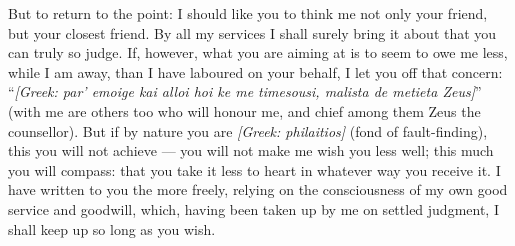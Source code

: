  But to return to the point: I should like you to think me not only your friend, but your closest friend. By all my services I shall surely bring it about that you can truly so judge. If, however, what you are aiming at is to seem to owe me less, while I am away, than I have laboured on your behalf, I let you off that concern: ``\textit{[Greek: par' emoige kai alloi hoi ke me timesousi, malista de metieta Zeus]}'' (with me are others too who will honour me, and chief among them Zeus the counsellor). But if by nature you are \textit{[Greek: philaitios]} (fond of fault-finding), this you will not achieve --- you will not make me wish you less well; this much you will compass: that you take it less to heart in whatever way you receive it. I have written to you the more freely, relying on the consciousness of my own good service and goodwill, which, having been taken up by me on settled judgment, I shall keep up so long as you wish.
